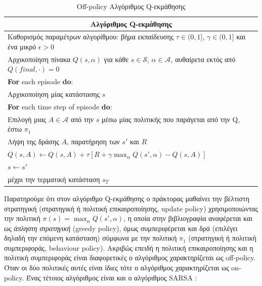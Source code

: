 \documentclass[11pt]{article} %
\numberwithin{equation}{subsection}
\begin{document}
\begin{table}[H]
\begin{tabular}{ |p{13cm}}
 \hline
 \multicolumn{1}{|c|}{\textbf{Αλγόριθμος Q-εκμάθησης}} \\
 \hline
 Καθορισμός παραμέτρων αλγορίθμου: βήμα εκπαίδευσης $\tau \in (0,1]$, $\gamma \in (0,1]$ και ένα μικρό $\epsilon > 0$ \\
 Αρχικοποίηση πίνακα $Q(s,\alpha)$ για κάθε $s \in \mathcal{S}$, $\alpha \in \mathcal{A}$, αυθαίρετα εκτός από $Q(final, \cdot) = 0$  \\
 \textbf{For} each episode \textbf{do}:\\
Αρχικοποίηση μίας κατάστασης $s$ \\
\textbf{For} each time step of episode \textbf{do}:  \\
Επιλογή μιας $A \in \mathcal{A}$ από την $s$ μέσω μίας πολιτικής που παράγεται από την Q, έστω $\pi_{1}$\\
Λήψη της δράσης $A$, παρατήρηση των $s'$ και $R$\\
$Q(s, A) \leftarrow Q(s, A) + \tau[R + \gamma \max_{\alpha}Q(s', \alpha) - Q(s, A)]$\\
$s \leftarrow s'$\\
μέχρι την τερματική κατάσταση $s_{T}$\\
\hline
\end{tabular}
\caption{Off-policy Αλγόριθμος Q-εκμάθησης}
\end{table}

Παρατηρούμε ότι στον αλγόριθμο Q-εκμάθησης ο πράκτορας μαθαίνει την βέλτιστη στρατηγική (στρατηγική ή πολιτική επικαιροποίησης, update policy) χρησιμοποιώντας την πολιτική $\pi(s) = \max_{\alpha}Q(s', \alpha)$, η οποία στην βιβλιογραφία αναφέρεται και ως \textit{άπληστη στρατηγική} (greedy policy), όμως συμπεριφέρεται και δρά (επιλέγει δηλαδή την επόμενη κατάσταση) σύμφωνα με την πολιτική $\pi_{1}$ (στρατηγική ή πολιτική συμπεριφοράς, behaviour policy). Ακριβώς επειδή η πολιτική επικαιροποίησης και η πολιτική συμπεριφοράς είναι διαφορετικές ο αλγόριθμος χαρακτηρίζεται ως off-policy. Όταν οι δύο πολιτικές αυτές είναι ίδιες τότε ο αλγόριθμος χαρακτηρίζεται ως on-policy. Ένας τέτοιος αλγόριθμος είναι και ο αλγόριθμος SARSA \cite{sutton}:\\
\end{document}
